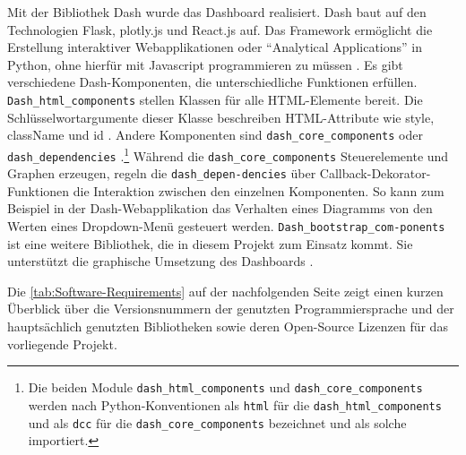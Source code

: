     Mit der Bibliothek Dash wurde das Dashboard realisiert. Dash baut auf den Technologien Flask, plotly.js und React.js auf. Das Framework ermöglicht die Erstellung interaktiver Webapplikationen 
    oder \enquote{Analytical Applications} in Python, ohne hierfür mit Javascript programmieren zu müssen \cite[vgl.][]{plotly_dash_2021}.
    Es gibt verschiedene Dash-Komponenten, die unterschiedliche Funktionen erfüllen. \texttt{Dash\_html\_components} stellen Klassen für alle HTML-Elemente bereit.
    Die Schlüsselwortargumente dieser Klasse beschreiben HTML-Attribute wie style, className und id \cite[vgl.][]{plotly_dash_2021-2}. 
    Andere Komponenten sind \texttt{dash\_core\_components} oder \texttt{dash\_dependencies} \cite[vgl.][]{plotly_dash_2021-1}.\footnote{ Die beiden Module \texttt{dash\_html\_components} und \texttt{dash\_core\_components} werden nach Python-Konventionen als \texttt{html} für die \texttt{dash\_html\_components} und als \texttt{dcc} für die \texttt{dash\_core\_components} bezeichnet und als solche importiert.}
    Während die \texttt{dash\_core\_components}
    Steuerelemente und Graphen erzeugen, regeln die \texttt{dash\_depen-dencies} über Callback-Dekorator-Funktionen die Interaktion zwischen den einzelnen Komponenten.
    So kann zum Beispiel in der Dash-Webapplikation das Verhalten eines Diagramms von den Werten eines Dropdown-Menü gesteuert werden. 
    \texttt{Dash\_bootstrap\_com-ponents} ist eine weitere Bibliothek, die in diesem Projekt zum Einsatz kommt. Sie unterstützt die graphische Umsetzung
    des Dashboards \cite[vgl.][]{faculty_dash_2021}.

    Die \autoref{tab:Software-Requirements} auf der nachfolgenden Seite zeigt einen kurzen Überblick über die Versionsnummern der genutzten Programmiersprache und der hauptsächlich 
    genutzten Bibliotheken sowie deren Open-Source Lizenzen für das vorliegende Projekt.
    
